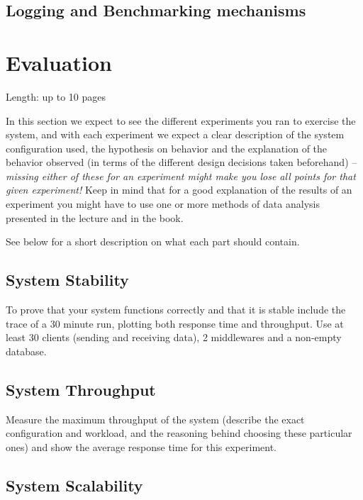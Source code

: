 \documentclass[11pt]{article}
\begin{document}
\subsection{Logging and Benchmarking mechanisms}\label{sec:logging-and-benchmarking-mechanisms}

\section{Evaluation}\label{sec:evaluation}

Length: up to 10 pages

In this section we expect to see the different experiments you ran to
exercise the system, and with each experiment we expect a clear
description of the system configuration used, the hypothesis on behavior
and the explanation of the behavior observed (in terms of the different
design decisions taken beforehand) -- \emph{missing either of these for
an experiment might make you lose all points for that given experiment!}
Keep in mind that for a good explanation of the results of an experiment
you might have to use one or more methods of data analysis presented in
the lecture and in the book.

See below for a short description on what each part should contain.

\subsection{System Stability}\label{sec:system-stability}

To prove that your system functions correctly and that it is stable
include the trace of a 30 minute run, plotting both response time and
throughput. Use at least 30 clients (sending and receiving data), 2
middlewares and a non-empty database.

\subsection{System Throughput}\label{sec:system-throughput}

Measure the maximum throughput of the system (describe the exact
configuration and workload, and the reasoning behind choosing these
particular ones) and show the average response time for this experiment.

\subsection{System Scalability}\label{sec:system-scalability}
\end{document}
